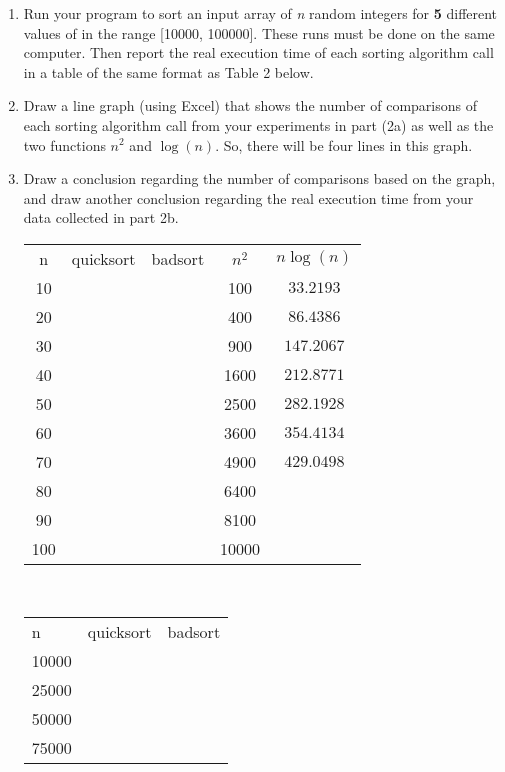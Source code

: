 \begin{enumerate}
\begin{enumerate}
  \item Run your program to sort an input array of \emph{n} random integers for \textbf{5} different values of in the range [10000, 100000]. These runs must be done on the same computer. Then report the real execution time of each sorting algorithm call in a table of the same format as Table 2 below.
  \item Draw a line graph (using Excel) that shows the number of comparisons of each sorting
algorithm call from your experiments in part (2a) as well as the two functions $n^{2}$ and $\log{(n)}$. So, there will be four lines in this graph.
  \item Draw a conclusion regarding the number of comparisons based on the graph, and draw another conclusion regarding the real execution time from your data collected in part 2b. \\
  \begin{tabular}{c c c c c}\\\hline
  n & quicksort & badsort & $n^{2}$ & $n\log{(n)}$ \\
 10 &           &         & 100     &  $33.2193$   \\
 20 &           &         & 400     &  $86.4386$   \\
 30 &           &         & 900     & $147.2067$   \\
 40 &           &         & 1600    & $212.8771$   \\
 50 &           &         & 2500    & $282.1928$   \\
 60 &           &         & 3600    & $354.4134$   \\
 70 &           &         & 4900    & $429.0498$   \\
 80 &           &         & 6400    & $$   \\
 90 &           &         & 8100    &              \\
100 &           &         & 10000   &              \\
  \end{tabular}\\
  \begin{tabular}{l l l}\\\hline
  n    & quicksort & badsort \\
10000  &           &         \\
25000  &           &         \\
50000  &           &         \\
75000  &           &         \\

\end{tabular}
\end{enumerate}
\end{enumerate}
